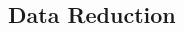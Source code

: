 \begin{CJK}{UTF8}{gbsn}
%
%
%
%
%
%
%
%
%
%
%
%
%
%
%








\subsection{Data Reduction\label{app9:dataReduction}}



\end{CJK}
